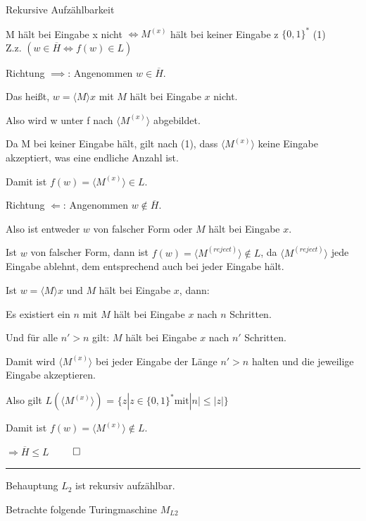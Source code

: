 \documentclass[answers]{submit}
\begin{document}
\begin{exercise}[6]{Rekursive Aufzählbarkeit}
{    M hält bei Eingabe x nicht $\iff M^{(x)}$ hält bei keiner Eingabe z $\{0,1\}^*$ (1) \\

    Z.z. $(w \in \overline{H} \iff f(w) \in L)$ \\

    \setlength{\parskip}{1em}

    Richtung $\implies$: Angenommen $w \in \overline{H}$.

    Das heißt, $w=\langle M\rangle x$ mit $M$ hält bei Eingabe $x$ nicht.

    Also wird w unter f nach $\langle M^{(x)}\rangle$ abgebildet.

    Da M bei keiner Eingabe hält, gilt nach (1), dass $\langle M^{(x)}\rangle$ keine Eingabe akzeptiert, was eine endliche Anzahl ist.

    Damit ist $f(w)=\langle M^{(x)}\rangle \in L$.

    \vspace{1cm}

    Richtung $\Leftarrow$: Angenommen $w \notin \overline{H}$.

    Also ist entweder $w$ von falscher Form oder $M$ hält bei Eingabe $x$.

    Ist $w$ von falscher Form, dann ist $f(w)=\langle M^{(reject)} \rangle \notin L$, da $\langle M^{(reject)} \rangle$ jede Eingabe ablehnt, dem entsprechend auch bei jeder Eingabe hält.

    Ist $w=\langle M\rangle x$ und $M$ hält bei Eingabe $x$, dann:

    Es existiert ein $n$ mit $M$ hält bei Eingabe $x$ nach $n$ Schritten.

    Und für alle $n'>n$ gilt: $M$ hält bei Eingabe $x$ nach $n'$ Schritten.

    Damit wird $\langle M^{(x)}\rangle$ bei jeder Eingabe der Länge $n'>n$ halten und die jeweilige Eingabe akzeptieren.

    Also gilt $L(\langle M^{(x)}\rangle)$ = $\{ z | z \in \{0,1\}^* \text{mit} |n| \leq |z| \} $

    Damit ist $f(w)=\langle M^{(x)}\rangle \notin L$.

    $\Rightarrow \overline{H} \leq L$ $\qed$

    \vspace{1cm}

    \rule{\textwidth}{0.4pt}

    Behauptung $L_2$ ist rekursiv aufzählbar.

    Betrachte folgende Turingmaschine $M_{L2}$

}
\end{exercise}
\end{document}
